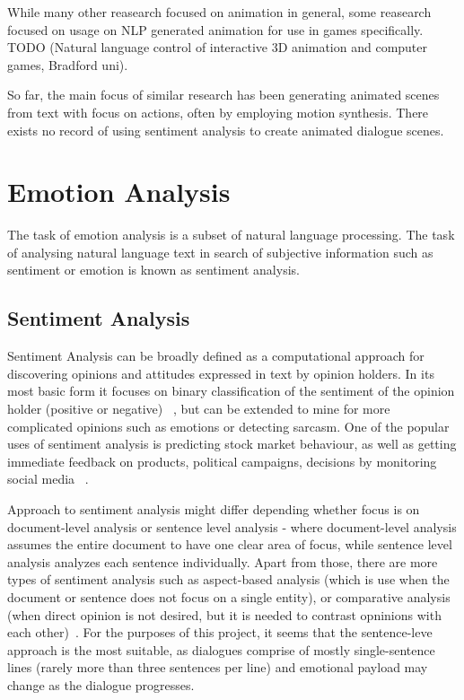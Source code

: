 While many other reasearch focused on animation in general, some reasearch focused on usage on NLP generated animation for use in games specifically. TODO (Natural language control of interactive 3D animation and computer games, Bradford uni).

So far, the main focus of similar research has been generating animated scenes from text with focus on actions, often by employing motion synthesis. There exists no record of using  sentiment analysis to create animated dialogue scenes.




\section{Emotion Analysis}

The task of emotion analysis is a subset of natural language processing. The task of analysing natural language text in search of subjective information such as sentiment or emotion is known as sentiment analysis.

\subsection{Sentiment Analysis}
Sentiment Analysis can be broadly defined as a computational approach for discovering opinions and attitudes expressed in text by opinion holders. In its most basic form it focuses on binary classification of the sentiment of the opinion holder (positive or negative) ~\cite{sentimentanal1}, but can be extended to mine for more complicated opinions such as emotions or detecting sarcasm. One of the popular uses of sentiment analysis is predicting stock market behaviour, as well as getting immediate feedback on products, political campaigns, decisions by monitoring social media ~\cite{sentimentanal2}.

Approach to sentiment analysis might differ depending whether focus is on document-level analysis or sentence level analysis - where document-level analysis assumes the entire document to have one clear area of focus, while sentence level analysis analyzes each sentence individually. Apart from those, there are more types of sentiment analysis such as aspect-based analysis (which is use when the document or sentence does not focus on a single entity), or comparative analysis (when direct opinion is not desired, but it is needed to contrast opninions with each other)~\cite{sentimentanal2}. For the purposes of this project, it seems that the sentence-leve approach is the most suitable, as dialogues comprise of mostly single-sentence lines (rarely more than three sentences per line) and emotional payload may change as the dialogue progresses.

